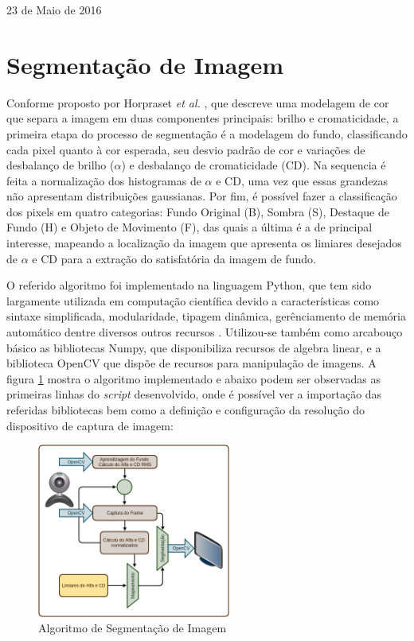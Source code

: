 \documentclass[conference]{IEEEtran}
\begin{document}
\hfill 23 de Maio de 2016

\section{Segmentação de Imagem}
Conforme proposto por Horpraset \textit{et al.} \cite{IEEEhowto:horprasert}, que descreve uma modelagem de cor que separa a imagem em duas componentes principais: brilho e cromaticidade, a primeira etapa do processo de segmentação é a modelagem do fundo, classificando cada pixel quanto à cor esperada, seu desvio padrão de cor e variações de desbalanço de brilho (\(\alpha\)) e desbalanço de cromaticidade (CD). Na sequencia é feita a normalização dos histogramas de \(\alpha\) e CD, uma vez que essas grandezas não apresentam distribuições gaussianas. Por fim, é possível fazer a classificação dos pixels em quatro categorias: Fundo Original (B), Sombra (S), Destaque de Fundo (H) e Objeto de Movimento (F), das quais a última é a de principal interesse, mapeando a localização da imagem que apresenta os limiares desejados de \(\alpha\) e CD para a extração do satisfatória da imagem de fundo.

O referido algoritmo foi implementado na linguagem Python, que tem sido largamente utilizada em computação científica devido a características como sintaxe simplificada, modularidade, tipagem dinâmica, gerênciamento de memória automático dentre diversos outros recursos \cite{IEEEhowto:fangohr}. Utilizou-se também como arcabouço básico as bibliotecas Numpy, que disponibiliza recursos de algebra linear, e a biblioteca OpenCV que dispõe de recursos para manipulação de imagens. A figura \ref{fig:algoritmo} mostra o algoritmo implementado e abaixo podem ser observadas as primeiras linhas do \textit{script} desenvolvido, onde é possível ver a importação das referidas bibliotecas bem como a definição e configuração da resolução do dispositivo de captura de imagem:



\begin{figure}[!t]
\centering
\includegraphics[width=2.5in]{Algoritmo}
\caption{Algoritmo de Segmentação de Imagem}
\label{fig:algoritmo}
\end{figure}
\end{document}
